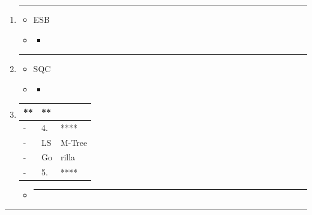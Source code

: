 \begin{enumerate}
\def\labelenumi{\arabic{enumi}.}
\item
  \begin{center}\rule{0.5\linewidth}{0.5pt}\end{center}

  \begin{itemize}
  \tightlist
  \item
    ESB
  \item
    \begin{itemize}
    \tightlist
    \item
    \end{itemize}
  \end{itemize}
\item
  \begin{center}\rule{0.5\linewidth}{0.5pt}\end{center}

  \begin{itemize}
  \tightlist
  \item
    SQC
  \item
    \begin{itemize}
    \tightlist
    \item
    \end{itemize}
  \end{itemize}
\item
  \begin{longtable}[]{@{}lll@{}}
  \toprule\noalign{}
  ** & ** & \\
  \midrule\noalign{}
  \endhead
  \bottomrule\noalign{}
  \endlastfoot
  - & 4. & **** \\
  - & LS & M-Tree \\
  - & Go & rilla \\
  - & 5. & **** \\
  \end{longtable}

  \begin{itemize}
  \item
    \begin{center}\rule{0.5\linewidth}{0.5pt}\end{center}
  \end{itemize}
\end{enumerate}

\begin{center}\rule{0.5\linewidth}{0.5pt}\end{center}

\subsection{}\label{section-44}

